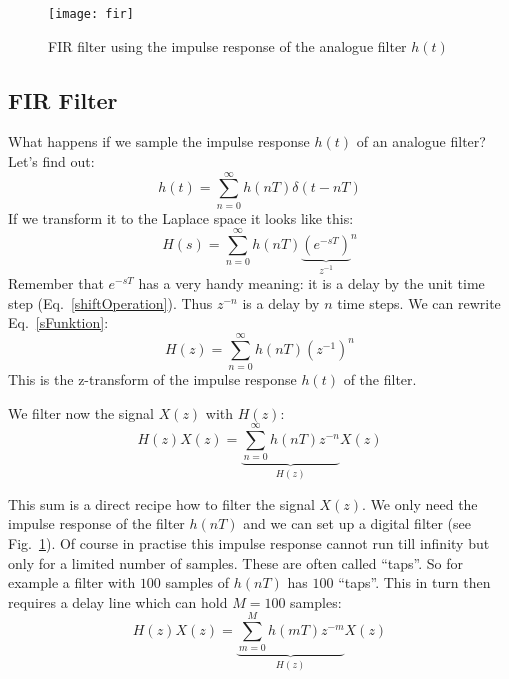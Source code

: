 \documentclass[12pt,a4paper]{article}
\begin{document}
\begin{figure}[!hbt]
\begin{center}
\mbox{\texttt{[image: fir]}}
\caption{FIR filter using the impulse response of the analogue filter $h(t)$ \label{FIRfilter}}
\end{center}
\end{figure}


\clearpage
\subsection{FIR Filter}
What happens if we sample the impulse response $h(t)$ of an
analogue filter? Let's find out:
\begin{equation}
\label{sampltime}
h(t)=\sum_{n=0}^\infty h(nT) \delta(t-nT)
\end{equation}
If we transform it to the Laplace space it looks like this:
\begin{equation}
\label{sFunktion}
H(s)=\sum_{n=0}^\infty h(nT) {\underbrace{{\left(e^{-sT}\right)}}_
                                           {z^{-1}}}^n
\end{equation}
Remember that $e^{-sT}$ has a very handy meaning: it is a delay
by the unit time step (Eq.~\ref{shiftOperation}).
Thus $z^{-n}$ is a delay by $n$ time steps.
We can rewrite Eq.~\ref{sFunktion}:
\begin{equation}
H(z)=\sum_{n=0}^\infty h(nT) {(z^{-1})}^n \label{ztrans}
\end{equation}
This is the z-transform of the impulse response $h(t)$ of the filter.

We filter now the signal $X(z)$ with $H(z)$:
\begin{equation}
H(z)X(z)=\underbrace{\sum_{n=0}^\infty h(nT) z^{-n}}_{H(z)} X(z) \label{notFIRyet}
\end{equation}

This sum is a direct recipe how to filter the signal $X(z)$. We only
need the impulse response of the filter $h(nT)$ and we can
set up a digital filter (see Fig.~\ref{FIRfilter}). Of course
in practise this impulse response cannot run till infinity
but only for a limited number of samples. These are often
called ``taps''. So for example a filter with $100$ samples of $h(nT)$ has
$100$ ``taps''. This in turn then requires a delay line which
can hold $M=100$ samples:
\begin{equation}
\label{FIRz}
H(z)X(z)=\underbrace{\sum_{m=0}^M h(mT) z^{-m}}_{H(z)} X(z) \label{FIRfromAnalogue}
\end{equation}
\end{document}
